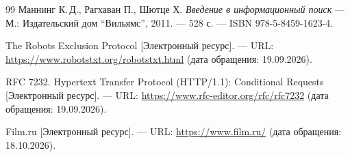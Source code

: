 \begin{thebibliography}{99}
Маннинг К.\,Д., Рагхаван П., Шютце Х.
{\itshape Введение в информационный поиск} --- М.: Издательский дом \enquote{Вильямс},
2011. --- 528 с. --- ISBN 978-5-8459-1623-4.

The Robots Exclusion Protocol [Электронный ресурс]. --- URL:
\href{https://www.robotstxt.org/robotstxt.html}{https://www.robotstxt.org/robotstxt.html}
(дата обращения: 19.09.2026).

RFC 7232. Hypertext Transfer Protocol (HTTP/1.1): Conditional Requests
[Электронный ресурс]. --- URL:
\href{https://www.rfc-editor.org/rfc/rfc7232}{https://www.rfc-editor.org/rfc/rfc7232}
(дата обращения: 19.09.2026).

Film.ru [Электронный ресурс]. --- URL:
\href{https://www.film.ru/}{https://www.film.ru/} (дата обращения: 18.10.2026).
\end{thebibliography}
